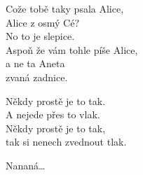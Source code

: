 \ve{}
Cože tobě taky psala Alice,\\
Alice z osmý Cé?\\
No to je slepice.\\
Aspoň že vám tohle píše Alice,\\
a ne ta Aneta\\
zvaná zadnice.
 
\cho{}
 
\cho{}
Někdy prostě je to tak. \\
A nejede přes to vlak. \\
Někdy prostě je to tak, \\
tak si nenech zvednout tlak.

Nananá…

\esong{}
